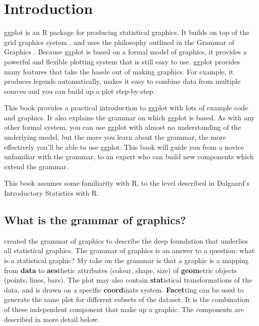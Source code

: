 

\chapter{Introduction}

ggplot is an R package for producing statistical graphics.  It builds on top of the grid graphics system \citep{grid}, and uses the philosophy outlined in the Grammar of Graphics \citep{wilkinson:2006}.  Because ggplot is based on a formal model of graphics, it provides a powerful and flexible plotting system that is still easy to use.  ggplot provides many features that take the hassle out of making graphics.  For example, it produces legends automatically, makes it easy to combine data from multiple sources and you can build up a plot step-by-step.

This book provides a practical introduction to ggplot with lots of example code and graphics. It also explains the grammar on which ggplot is based. As with any other formal system, you can use ggplot with almost no understanding of the underlying model, but the more you learn about the grammar, the more effectively you'll be able to use ggplot.  This book will guide you from a novice unfamiliar with the grammar, to an expert who can build new components which extend the grammar.

This book assumes some familiarity with R, to the level described in Dalgaard’s Introductory Statistics with R.

% 
% 

\section{What is the grammar of graphics?}

\citet{wilkinson:2006} created the grammar of graphics to describe the deep foundation that underlies all statistical graphics.  The grammar of graphics is an answer to a question: what is a statistical graphic?  My take on the grammar is that a graphic is a mapping from {\bf data} to {\bf aes}thetic attributes (colour, shape, size) of {\bf geom}etric objects (points, lines, bars).  The plot may also contain {\bf stat}istical transformations of the data, and is drawn on a specific {\bf coord}inate system.  {\bf Facet}ting can be used to generate the same plot for different subsets of the dataset.  It is the combination of these independent component that make up a graphic.  The components are described in more detail below.

